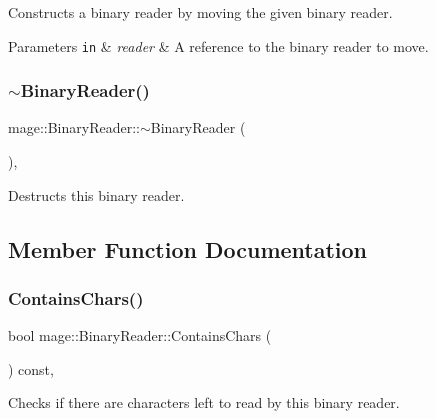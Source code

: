 Constructs a binary reader by moving the given binary reader.


\begin{DoxyParams}[1]{Parameters}
\mbox{\tt in}  & {\em reader} & A reference to the binary reader to move. \\
\hline
\end{DoxyParams}
\mbox{\label{classmage_1_1_binary_reader_a42e6c31bc53f5214675f845756b5a404}} 
\subsubsection{\texorpdfstring{$\sim$\+Binary\+Reader()}{~BinaryReader()}}
{\footnotesize\ttfamily mage\+::\+Binary\+Reader\+::$\sim$\+Binary\+Reader (\begin{DoxyParamCaption}{ }\end{DoxyParamCaption})\hspace{0.3cm}{\ttfamily [protected]}, {\ttfamily [default]}}

Destructs this binary reader. 

\subsection{Member Function Documentation}
\mbox{\label{classmage_1_1_binary_reader_af68b85b30fbe8b5f2d4720163a658ab5}} 
\subsubsection{\texorpdfstring{Contains\+Chars()}{ContainsChars()}}
{\footnotesize\ttfamily bool mage\+::\+Binary\+Reader\+::\+Contains\+Chars (\begin{DoxyParamCaption}{ }\end{DoxyParamCaption}) const\hspace{0.3cm}{\ttfamily [protected]}, {\ttfamily [noexcept]}}

Checks if there are characters left to read by this binary reader.

